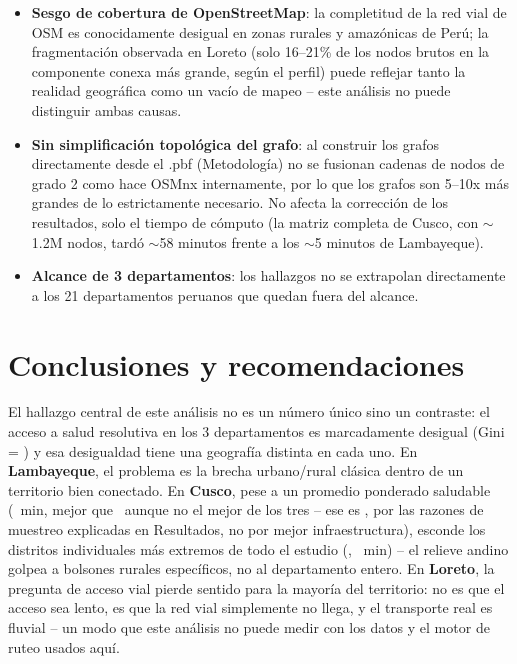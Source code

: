 \documentclass[11pt]{article}
\begin{document}
\begin{itemize}
  puntos de demanda frente a un tope de \statMaxDemandPoints, se aplicó
  muestreo estratificado
  ponderado por población, lo que introduce error de muestreo respecto al
  universo completo, mayor cuanto más pequeño y disperso es el conjunto de
  un departamento.
  \item \textbf{Sesgo de cobertura de OpenStreetMap}: la completitud de la
  red vial de OSM es conocidamente desigual en zonas rurales y amazónicas
  de Perú; la fragmentación observada en Loreto (solo 16--21\% de los
  nodos brutos en la componente conexa más grande, según el perfil) puede
  reflejar tanto la realidad geográfica como un vacío de mapeo -- este
  análisis no puede distinguir ambas causas.
  \item \textbf{Sin simplificación topológica del grafo}: al construir los
  grafos directamente desde el .pbf (Metodología) no se fusionan cadenas
  de nodos de grado 2 como hace OSMnx internamente, por lo que los grafos
  son 5--10x más grandes de lo estrictamente necesario. No afecta la
  corrección de los resultados, solo el tiempo de cómputo (la matriz
  completa de Cusco, con $\sim$1.2M nodos, tardó $\sim$58 minutos frente a
  los $\sim$5 minutos de Lambayeque).
  \item \textbf{Alcance de 3 departamentos}: los hallazgos no se
  extrapolan directamente a los 21 departamentos peruanos que quedan
  fuera del alcance.
\end{itemize}

\section{Conclusiones y recomendaciones}

El hallazgo central de este análisis no es un número único sino un
contraste: el acceso a salud resolutiva en los 3 departamentos es
marcadamente desigual (Gini = \statGini) y esa desigualdad tiene una
geografía distinta en cada uno. En \textbf{Lambayeque}, el problema es la
brecha urbano/rural clásica dentro de un territorio bien conectado. En
\textbf{Cusco}, pese a un promedio ponderado saludable
(\statMeanAccessCusco\ min, mejor que \statWorstAvgDept\ aunque no el
mejor de los tres -- ese es \statBestAvgDept, por las razones de muestreo
explicadas en Resultados, no por mejor infraestructura), esconde los
distritos individuales más extremos de todo el estudio
(\statWorstDistrictName, \statWorstDistrictMean\ min) -- el relieve andino
golpea a bolsones
rurales específicos, no al departamento entero. En \textbf{Loreto}, la
pregunta de acceso vial pierde sentido para la mayoría del territorio: no
es que el acceso sea lento, es que la red vial simplemente no llega, y el
transporte real es fluvial -- un modo que este análisis no puede medir
con los datos y el motor de ruteo usados aquí.
\end{document}
